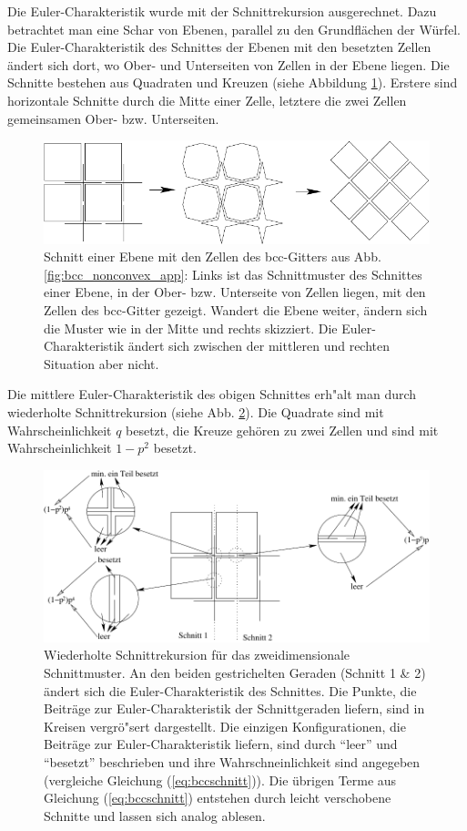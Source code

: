Die Euler-Charakteristik wurde mit der Schnittrekursion ausgerechnet. Dazu betrachtet man eine Schar von Ebenen, parallel zu den Grundfl\"achen der W\"urfel. Die Euler-Charakteristik des Schnittes der Ebenen mit den besetzten Zellen \"andert sich dort, wo Ober- und Unterseiten von Zellen in der Ebene liegen. Die Schnitte bestehen aus Quadraten und Kreuzen (siehe Abbildung \ref{fig:bccnonconvexschnitt}). Erstere sind horizontale Schnitte durch die Mitte einer Zelle, letztere die zwei Zellen gemeinsamen Ober- bzw. Unterseiten.
\begin{figure} [htbp]
\centering
\includegraphics{./Fluct_topo-Figs/bcc-schnitt}
\caption{Schnitt einer Ebene mit den Zellen des bcc-Gitters aus Abb. \ref{fig:bcc_nonconvex_app}: Links ist das Schnittmuster des Schnittes einer Ebene, in der Ober- bzw. Unterseite von Zellen liegen, mit den Zellen des bcc-Gitter gezeigt. Wandert die Ebene weiter, \"andern sich die Muster wie in der Mitte und rechts skizziert. Die Euler-Charakteristik \"andert sich zwischen der mittleren und rechten Situation aber nicht.}
\label{fig:bccnonconvexschnitt}
\end{figure}
Die mittlere Euler-Charakteristik des obigen Schnittes erh"alt man durch wiederholte Schnittrekursion (siehe Abb. \ref{fig:bccschnittzoom}). Die Quadrate sind mit Wahrscheinlichkeit $q$ besetzt, die Kreuze geh\"oren zu zwei Zellen und sind mit Wahrscheinlichkeit $1-p^2$ besetzt. 
\begin{figure}[htbp]
  \centering
  \includegraphics{./Fluct_topo-Figs/bcc-schnittzoom}
  \caption{Wiederholte Schnittrekursion f\"ur das zweidimensionale Schnittmuster. An den beiden gestrichelten Geraden (Schnitt 1 \& 2) \"andert sich die Euler-Charakteristik des Schnittes. Die Punkte, die Beitr\"age zur Euler-Charakteristik der Schnittgeraden liefern, sind in Kreisen vergr\"o"sert dargestellt. Die einzigen Konfigurationen, die Beitr\"age zur Euler-Charakteristik liefern, sind durch ``leer'' und ``besetzt'' beschrieben und ihre Wahrschneinlichkeit sind angegeben (vergleiche Gleichung (\ref{eq:bccschnitt})). Die \"ubrigen Terme aus Gleichung (\ref{eq:bccschnitt}) entstehen durch leicht verschobene Schnitte und lassen sich analog ablesen.  }
  \label{fig:bccschnittzoom}
\end{figure}

